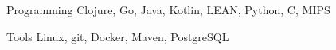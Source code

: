

\begin{cvskills}

  \cvskill
    {Programming} %
    {Clojure, Go, Java, Kotlin, LEAN, Python, C, MIPS} %

  \cvskill
    {Tools} %
    {Linux, git, Docker, Maven, PostgreSQL} %
\end{cvskills}
